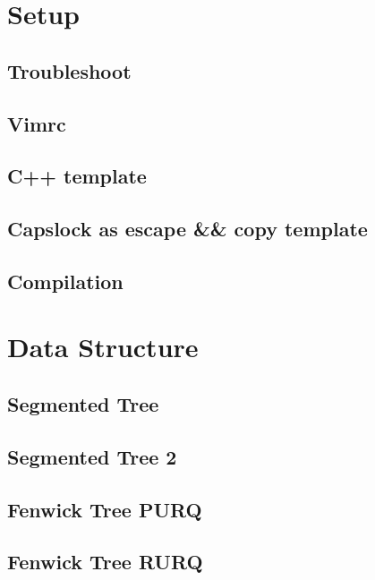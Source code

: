 \section{Setup}
\subsection{Troubleshoot}
\raggedbottom
\hrulefill
\subsection{Vimrc}
\raggedbottom
\hrulefill
\subsection{C++ template}
\raggedbottom
\hrulefill
\subsection{Capslock as escape \&\& copy template}
\raggedbottom
\hrulefill
\subsection{Compilation}
\raggedbottom
\hrulefill


\section{Data Structure}
\subsection{Segmented Tree}
\raggedbottom
\hrulefill
\subsection{Segmented Tree 2}
\raggedbottom
\hrulefill
\subsection{Fenwick Tree PURQ}
\raggedbottom
\hrulefill
\subsection{Fenwick Tree RURQ}
\raggedbottom
\hrulefill
